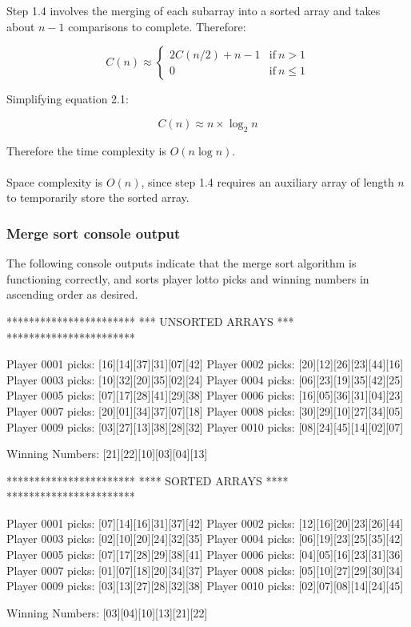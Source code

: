 Step 1.4 involves the merging of each subarray into a sorted array and takes about $n - 1$ comparisons to complete. Therefore:

\begin{equation}
C(n) \approx \left\{\begin{matrix}
2C(n/2) + n - 1 & \mbox{if} \ n > 1 \\ 
0 & \mbox{if} \ n \leq 1 
\end{matrix}\right.
\end{equation}

\newpage
\noindent
Simplifying equation 2.1:

\begin{equation}
C(n) \approx n \times \log_2n
\end{equation}

\noindent
Therefore the time complexity is $O(n \log n)$.
\\
\\
Space complexity is $O(n)$, since step 1.4 requires an auxiliary array of length $n$ to temporarily store the sorted array.

\subsubsection{Merge sort console output}

The following console outputs indicate that the merge sort algorithm is functioning correctly, and sorts player lotto picks and winning numbers in ascending order as desired.
\\
\begin{consolecode}
***********************
*** UNSORTED ARRAYS ***
***********************

Player 0001 picks: [16][14][37][31][07][42]
Player 0002 picks: [20][12][26][23][44][16]
Player 0003 picks: [10][32][20][35][02][24]
Player 0004 picks: [06][23][19][35][42][25]
Player 0005 picks: [07][17][28][41][29][38]
Player 0006 picks: [16][05][36][31][04][23]
Player 0007 picks: [20][01][34][37][07][18]
Player 0008 picks: [30][29][10][27][34][05]
Player 0009 picks: [03][27][13][38][28][32]
Player 0010 picks: [08][24][45][14][02][07]

Winning Numbers:   [21][22][10][03][04][13]
\end{consolecode}

\begin{consolecode}
***********************
**** SORTED ARRAYS ****
***********************

Player 0001 picks: [07][14][16][31][37][42]
Player 0002 picks: [12][16][20][23][26][44]
Player 0003 picks: [02][10][20][24][32][35]
Player 0004 picks: [06][19][23][25][35][42]
Player 0005 picks: [07][17][28][29][38][41]
Player 0006 picks: [04][05][16][23][31][36]
Player 0007 picks: [01][07][18][20][34][37]
Player 0008 picks: [05][10][27][29][30][34]
Player 0009 picks: [03][13][27][28][32][38]
Player 0010 picks: [02][07][08][14][24][45]

Winning Numbers:   [03][04][10][13][21][22]
\end{consolecode}

